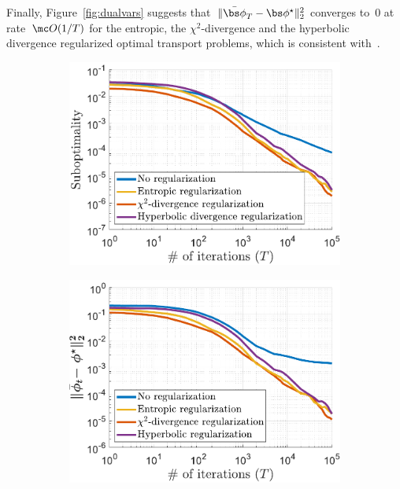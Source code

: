 \documentclass[11pt, a4paper, oneside, reqno]{article}
\begin{document}
    Finally, Figure~\ref{fig:dualvars} suggests {\color{black} that~$\| \bar {\bs \phi}_T - \bs \phi^\star \|^2_2$ converges to~$0$ at rate~$\mc O(1/T)$ for the entropic, the $\chi^2$-divergence and the hyperbolic divergence} regularized optimal transport problems, which is consistent with~\citep[Proposition~10]{bach2013adaptivity}.
    \begin{figure}[t]
     \centering
     \begin{subfigure}[h]{0.43\columnwidth}
         \includegraphics[width=\textwidth]{convergence.pdf}
         \caption{}
         \label{fig:suboptimality}
     \end{subfigure}
     \hspace{2cm}
     \begin{subfigure}[h]{0.43\columnwidth}
         \includegraphics[width=\textwidth]{dualvars.pdf}

\end{subfigure}
\end{figure}
\end{document}
